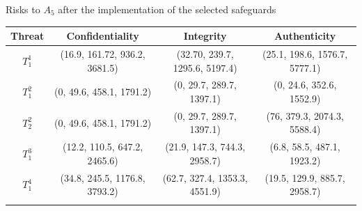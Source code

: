\begin{stripedtable}[htb]
	\centering
	\caption{Risks to $A_5$ after the implementation of the selected safeguards}
	\label{table:risk}
	\begin{scriptsize}
	\begin{tabular}{cccc}
		\toprule
		\hiderowcolors
		Threat & Confidentiality & Integrity & Authenticity \\
		\midrule
		\showrowcolors
		$T_{1}^{1}$ & (16.9, 161.72, 936.2, 3681.5) & (32.70, 239.7, 1295.6, 5197.4) & (25.1, 198.6, 1576.7, 5777.1)\\
		$T_{1}^{2}$ & (0, 49.6, 458.1, 1791.2) & (0, 29.7, 289.7, 1397.1) & (0, 24.6, 352.6, 1552.9)\\
		$T_{2}^{2}$ & (0, 49.6, 458.1, 1791.2) & (0, 29.7, 289.7, 1397.1) & (76, 379.3, 2074.3, 5588.4)\\
		$T_{1}^{3}$ & (12.2, 110.5, 647.2, 2465.6) & (21.9, 147.3, 744.3, 2958.7) & (6.8, 58.5, 487.1, 1923.2)\\
		$T_{1}^{4}$ & (34.8, 245.5, 1176.8, 3793.2) & (62.7, 327.4, 1353.3, 4551.9) & (19.5, 129.9, 885.7, 2958.7)\\
		\bottomrule
		\hiderowcolors
	\end{tabular}
	\end{scriptsize}
\end{stripedtable}
